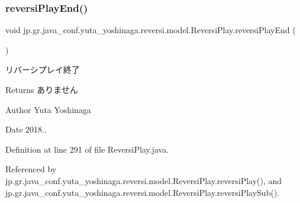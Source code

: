 \subsubsection{\texorpdfstring{reversi\+Play\+End()}{reversiPlayEnd()}}
{\footnotesize\ttfamily void jp.\+gr.\+java\+\_\+conf.\+yuta\+\_\+yoshinaga.\+reversi.\+model.\+Reversi\+Play.\+reversi\+Play\+End (\begin{DoxyParamCaption}{ }\end{DoxyParamCaption})}



リバーシプレイ終了 

\begin{DoxyReturn}{Returns}
ありません 
\end{DoxyReturn}
\begin{DoxyAuthor}{Author}
Yuta Yoshinaga 
\end{DoxyAuthor}
\begin{DoxyDate}{Date}
2018.. 
\end{DoxyDate}


Definition at line 291 of file Reversi\+Play.\+java.



Referenced by jp.\+gr.\+java\+\_\+conf.\+yuta\+\_\+yoshinaga.\+reversi.\+model.\+Reversi\+Play.\+reversi\+Play(), and jp.\+gr.\+java\+\_\+conf.\+yuta\+\_\+yoshinaga.\+reversi.\+model.\+Reversi\+Play.\+reversi\+Play\+Sub().

